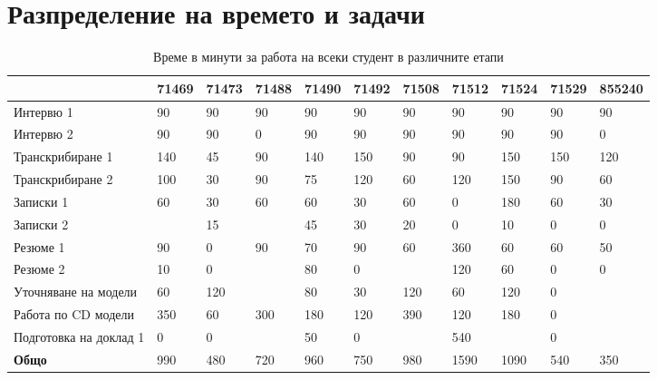 \documentclass[]{article}
\begin{document}
\begin{enumerate}[I.]
{	
	}
	
\end{enumerate}

\clearpage

\section{Разпределение на времето и задачи}

\begin{table}[h]
\centering
\caption{Време в минути за работа на всеки студент в различните етапи}
\label{my-label}
\begin{tabular}{|l|l|l|l|l|l|l|l|l|l|l|}
\hline
                        & 71469 & 71473 & 71488 & 71490 & 71492 & 71508 & 71512 & 71524 & 71529 & 855240 \\ \hline
Интервю 1               & 90    & 90    & 90    & 90    & 90    & 90    & 90    & 90    & 90    & 90     \\ \hline
Интервю 2               & 90    & 90    & 0     & 90    & 90    & 90    & 90    & 90    & 90    & 0      \\ \hline
Транскрибиране 1        & 140   & 45    & 90    & 140   & 150   & 90    & 90    & 150   & 150   & 120    \\ \hline
Транскрибиране 2        & 100   & 30    & 90    & 75    & 120   & 60    & 120   & 150   & 90    & 60     \\ \hline
Записки 1               & 60    & 30    & 60    & 60    & 30    & 60    & 0     & 180   & 60    & 30     \\ \hline
Записки 2               &       & 15    &       & 45    & 30    & 20    & 0     & 10    & 0     & 0      \\ \hline
Резюме 1                & 90    & 0     & 90    & 70    & 90    & 60    & 360   & 60    & 60    & 50     \\ \hline
Резюме 2                & 10    & 0     &       & 80    & 0     &       & 120   & 60    & 0     & 0      \\ \hline
Уточняване на модели    & 60    & 120   &       & 80    & 30    & 120   & 60    & 120   & 0     &        \\ \hline
Работа по CD модели     & 350   & 60    & 300   & 180   & 120   & 390   & 120   & 180   & 0     &        \\ \hline
Подготовка на доклад 1  & 0     & 0     &       & 50    & 0     &       & 540   &       & 0     &        \\ \hline
\textbf{Общо}           & 990   & 480   & 720   & 960   & 750   & 980   & 1590  & 1090  & 540   & 350    \\ \hline
\end{tabular}
\end{table}
\end{document}
